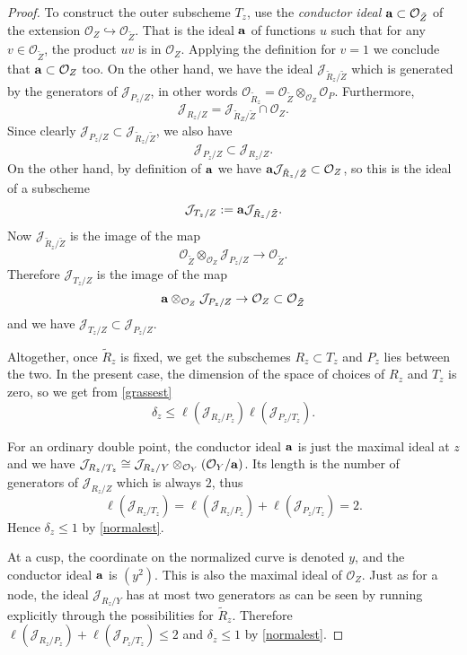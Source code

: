 \documentclass{amsart}
\theoremstyle{plain}
\numberwithin{equation}{section}
\begin{document}
\begin{proof}
To construct the outer subscheme $T_z$, use the {\em conductor ideal} 
${\bf a}\subset {{\mathcal O}} _{\tilde{Z}}$  of the extension
${{\mathcal O}} _Z\hookrightarrow {{\mathcal O}} _{\tilde{Z}}$. 
That is the ideal ${\bf a}$ of functions $u$ such that for any 
$v\in {{\mathcal O}} _{\tilde{Z}}$, the product $uv$ is in ${{\mathcal O}} _Z$.  Applying the definition for $v=1$
we conclude that ${\bf a}\subset {{\mathcal O}} _Z$ too.
On the other hand, we have
the ideal ${{\mathcal J}} _{\tilde{R}_z/\tilde{Z}}$ which is generated by the generators of 
${{\mathcal J}} _{P_z/Z}$, in other words ${{\mathcal O}} _{\tilde{R}_z}={{\mathcal O}} _{\tilde{Z}}\otimes _{{{\mathcal O}} _Z}{{\mathcal O}} _P$.
Furthermore, 
$$
{{\mathcal J}} _{R_z/Z}= {{\mathcal J}} _{\tilde{R}_Z/\tilde{Z}}\cap {{\mathcal O}} _Z.
$$
Since clearly ${{\mathcal J}} _{P_z/Z}\subset {{\mathcal J}} _{\tilde{R}_z/\tilde{Z}}$, we also have
$$
{{\mathcal J}} _{P_z/Z}\subset {{\mathcal J}} _{R_z/Z}. 
$$
On the other hand, by definition of ${\bf a}$ we have
${\bf a}{{\mathcal J}} _{\tilde{R}_z/\tilde{Z}}\subset {{\mathcal O}} _Z$, so this is the ideal of a subscheme 
$$
{{\mathcal J}} _{T_z/Z}:= {\bf a}{{\mathcal J}} _{\tilde{R}_z/\tilde{Z}}.
$$
Now ${{\mathcal J}} _{\tilde{R}_z/\tilde{Z}}$ is the image of the map 
$$
{{\mathcal O}} _{\tilde{Z}}\otimes _{{{\mathcal O}} _Z}{{\mathcal J}} _{P_z/Z}\rightarrow {{\mathcal O}} _{\tilde{Z}}.
$$
Therefore ${{\mathcal J}} _{T_z/Z}$ is the image of the map  
$$
{\bf a}\otimes _{{{\mathcal O}} _Z}{{\mathcal J}} _{P_z/Z}\rightarrow {{\mathcal O}} _Z\subset {{\mathcal O}} _{\tilde{Z}}
$$
and we have ${{\mathcal J}} _{T_z/Z}\subset {{\mathcal J}} _{P_z/Z}$. 

Altogether, once $\tilde{R}_z$ is fixed, we get the subschemes $R_z\subset T_z$
and $P_z$ lies between the two. In the present case, the dimension of the
space of choices of $R_z$ and $T_z$ is zero, so we get from \eqref{grassest} 
\begin{equation}
\label{normalest}
\delta _z \leq \ell ({{\mathcal J}} _{R_z/P_z})\ell ({{\mathcal J}} _{P_z/T_z}).
\end{equation}

For an ordinary double point, the conductor ideal ${\bf a}$ is
just the maximal ideal at $z$ and we have ${{\mathcal J}} _{R_z/T_z}\cong {{\mathcal J}} _{R_z/Y}\otimes _{{{\mathcal O}} _Y}({{\mathcal O}} _Y/{\bf a})$. Its length is
the number of generators of 
${{\mathcal J}} _{R_z/Z}$ which is always $2$, thus
$$
\ell ({{\mathcal J}} _{R_z/T_z}) = \ell ({{\mathcal J}} _{R_z/P_z})+\ell ({{\mathcal J}} _{P_z/T_z}) =2.
$$
Hence $\delta _z\leq 1$ by \eqref{normalest}. 

At a cusp, the coordinate on the normalized curve is denoted $y$,
and the conductor ideal ${\bf a}$ is $(y^2)$. This is also the maximal ideal of ${{\mathcal O}} _Z$.
Just as for a node, the ideal ${{\mathcal J}} _{R_z/Y}$ has at most two generators as can be 
seen by running explicitly through the possibilities for $\tilde{R}_z$. 
Therefore $\ell ({{\mathcal J}} _{R_z/P_z})+\ell ({{\mathcal J}} _{P_z/T_z})\leq 2$ and $\delta _z\leq 1$ by \eqref{normalest}. 
\end{proof}
\end{document}
